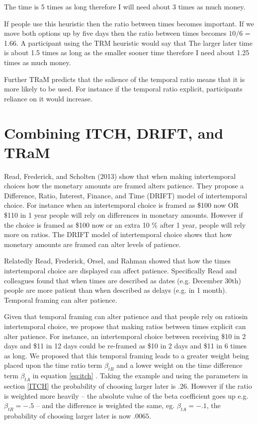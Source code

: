 \documentclass[]{article}
\begin{document}
The time is 5 times as long therefore I will need about 3 times as much money. 

If people use this heuristic then the ratio between times becomes important. 
If we move both options up by five days then the ratio between times becomes $10/6$ = 1.66. A participant using the TRM heuristic would say that 
The larger later time is about 1.5 times as long as the smaller sooner time therefore I need about 1.25 times as much money. 

Further TRaM predicts that the salience of the temporal ratio means that it is more likely to be used. 
For instance if the temporal ratio explicit, participants reliance on it would increase.



\section{Combining ITCH, DRIFT, and TRaM }

Read, Frederick, and Scholten (2013) show that when making intertemporal choices how the monetary amounts are framed alters patience. 
They propose a Difference, Ratio, Interest, Finance, and Time (DRIFT) model of intertemporal choice. 
For instance when an intertemporal choice is framed as \$100 now OR \$110 in 1 year people will rely on differences in monetary amounts.
However if the choice is framed as \$100 now or an extra 10 \% after 1 year, people will rely more on ratios. 
The DRIFT model of intertemporal choice shows that how monetary amounts are framed can alter levels of patience.

Relatedly Read, Frederick, Orsel, and Rahman showed that how the times intertemporal choice are displayed can affect patience. Specifically Read and colleagues found that when times are described as dates (e.g. December 30th) people are more patient than when described as delays (e.g. in 1 month). Temporal framing can alter patience. 

Given that temporal framing can alter patience and that people rely on ratiosin intertemporal choice, we propose that making ratios between times explicit can alter patience. 
For instance, an intertemporal choice between receiving \$10 in 2 days and \$11 in 12 days could be re-framed as \$10 in 2 days and \$11 in 6 times as long. 
We proposed that this temporal framing leads to a greater weight being placed upon the time ratio term $\beta_{tR}$ and a lower weight on the time difference term $\beta_{tA}$ in equation \ref{eq:itch} . Taking the example and using the parameters in section \ref{ITCH} the probability of choosing larger later is $.26$. However if the ratio is weighted more heavily -- the absolute value of the beta coefficient goes up e.g.  $\beta_{tR} = -.5 $ -- and the difference is weighted the same, eg. $\beta_{tA} = -.1$, the probability of choosing larger later is now $.0065$. 
\end{document}
